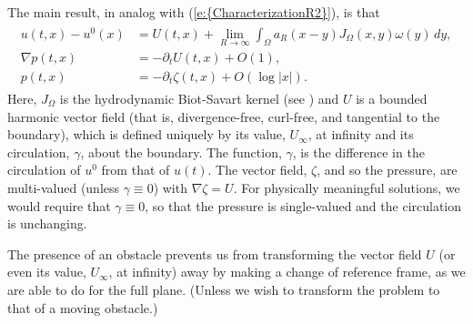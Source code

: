 \documentclass[reqno,openright,11pt,twoside]{amsart}
\theoremstyle{definition}
\numberwithin{equation}{section}
\begin{document}
The main result, in analog with {(\ref{e:{CharacterizationR2}})}, is that
\begin{align}\label{e:CharacterizationExt}
	\begin{split}
			u(t, x) - u^0(x)
				&= U(t, x)
					+ 
				\lim_{R \to {\ensuremath{\infty}}}\int_\Omega a_R(x - y)
				    {J_\Omega}(x, y) \omega(y)
				    \, dy, \\
		{\ensuremath{\nabla}} p(t, x) &= - {\ensuremath{\partial}}_t U(t, x) + O(1), \\
		p(t, x) &= - {\ensuremath{\partial}}_t \zeta(t, x) + O(\log {\left\vert{x}\right\vert}).
	\end{split}
\end{align}
Here, ${J_\Omega}$ is the hydrodynamic Biot-Savart kernel (see \cite{AKLL2014}) and $U$ is a bounded harmonic vector field (that is, divergence-free, curl-free, and tangential to the boundary), which is defined uniquely by its value, $U_{\ensuremath{\infty}}$, at infinity and its circulation, $\gamma$, about the boundary. The function, $\gamma$, is the difference in the circulation of $u^0$ from that of $u(t)$. The vector field, $\zeta$, and so the pressure, are multi-valued (unless $\gamma \equiv 0$) with ${\ensuremath{\nabla}} \zeta = U$. For physically meaningful solutions, we would require that $\gamma \equiv 0$, so that the pressure is single-valued and the circulation is unchanging.

The presence of an obstacle prevents us from transforming the vector field $U$ (or even its value, $U_{\ensuremath{\infty}}$, at infinity) away by making a change of reference frame, as we are able to do for the full plane. (Unless we wish to transform the problem to that of a moving obstacle.)
\end{document}
